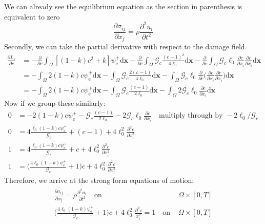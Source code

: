 \documentclass[12pt,3p]{article}
\numberwithin{equation}{section}
\begin{document}
We can already see the equilibrium equation as the section in parenthesis is equivalent to zero
\begin{equation}\label{EqmEq}
\frac{\partial \sigma_{i j}}{\partial x_j} = \rho \frac{\partial^2 u_i}{\partial t^2} 
\end{equation}
Secondly, we can take the partial derivative with respect to the damage field. 
\begin{align*}
\frac{\partial L_{\varepsilon}}{\partial c} &= 
- \frac{\partial}{\partial c} \int_{\Omega} \left[(1-k) c^{2} + k \right] \psi_{\mathrm{e}}^{+} \mathrm{d} \boldsymbol{x} 
- \frac{\partial}{\partial c} \int_{\Omega} \mathcal{G}_{c} \frac{(c-1)^{2}}{4 \ell_{0}} \mathrm{d} \boldsymbol{x} 
- \frac{\partial}{\partial c} \int_{\Omega} \mathcal{G}_{c} \ell_{0} \frac{\partial c}{\partial x_{i}} \frac{\partial c}{\partial x_{i}} \mathrm{d} \boldsymbol{x} \\
&= 
-\int_{\Omega} 2 (1 - k) c \psi_{\mathrm{e}}^{+} \mathrm{d} \boldsymbol{x}
- \int_{\Omega} \mathcal{G}_{c} \frac{2 (c-1)}{4 \ell_{0}} \mathrm{d} \boldsymbol{x} 
- \int_{\Omega} \mathcal{G}_{c} \ell_{0} \frac{\partial}{\partial c} \bigg( \frac{\partial c}{\partial x_{i}} \frac{\partial c}{\partial x_{i}} \bigg) \mathrm{d} \boldsymbol{x} \\
&= 
- \int_{\Omega} 2 (1 - k) c \psi_{\mathrm{e}}^{+} \mathrm{d} \boldsymbol{x}
- \int_{\Omega} \mathcal{G}_{c} \frac{(c-1)}{2 \ell_{0}} \mathrm{d} \boldsymbol{x} 
- \int_{\Omega} 2 \mathcal{G}_{c} \ell_{0} \frac{\partial c}{\partial x_i} \mathrm{d} \boldsymbol{x} 
\end{align*}
Now if we group these similarly: 
\begin{align*}
0 &= - 2 (1 - k) c \psi_{\mathrm{e}}^{+} - \mathcal{G}_{c} \frac{(c-1)}{2 \ell_{0}} - 2 \mathcal{G}_{c} \ell_{0} \frac{\partial c}{\partial x_i} \quad \text{multiply through by } -2 \ell_0 / \mathcal{G}_c \\
0 &= 4 \frac{\ell_0 (1 - k) c \psi_{\mathrm{e}}^{+}}{\mathcal{G}_c} + (c-1) + 4 \ell_{0}^2 \frac{\partial^2 c}{\partial x_i^2} \\
1 &= 4 \frac{\ell_0 (1 - k) c \psi_{\mathrm{e}}^{+}}{\mathcal{G}_c} + c + 4 \ell_{0}^2 \frac{\partial^2 c}{\partial x_i^2} \\
1 &= \bigg( \frac{4 \ell_0 (1 - k) \psi_{\mathrm{e}}^{+}}{\mathcal{G}_c} + 1 \bigg) c + 4 \ell_{0}^2 \frac{\partial^2 c}{\partial x_i^2}
\end{align*}
Therefore, we arrive at the strong form equations of motion: 
\begin{align}\label{EqMotion}
\begin{split}
\frac{\partial \sigma_{i j}}{\partial x_j} = \rho \frac{\partial^2 u_i}{\partial t^2} \quad \text{on }& \Omega \times [0, T]\\
\bigg( \frac{4 \ell_0 (1 - k) \psi_{\mathrm{e}}^{+}}{\mathcal{G}_c} + 1 \bigg) c + 4 \ell_{0}^2 \frac{\partial^2 c}{x_i^2} = 1 \quad \text{on }& \Omega \times [0, T]
\end{split}
\end{align}
\end{document}
